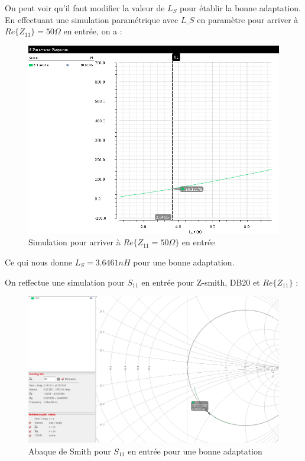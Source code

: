 \documentclass[a4paper]{article}
\begin{document}
On peut voir qu'il faut modifier la valeur de $L_S$ pour \'etablir la bonne
adaptation. En effectuant une simulation param\'etrique avec $L\_S$ en param\`etre
pour arriver \`a $Re\{Z_{11}\} = 50 \Omega$ en entr\'ee, on a :

\begin{figure}[!htb]
\begin{center}
  \includegraphics[width=0.7\linewidth]{Q2-C-sim-adaptation.png}
  \caption{Simulation pour arriver \`a $Re\{Z_{11} = 50 \Omega\}$ en entr\'ee }
  \label{RES11-param-LS}
\end{center}
\end{figure}

Ce qui nous donne $L_S = 3.6461 nH$ pour une bonne adaptation.

\clearpage

On reffectue une simulation pour $S_{11}$ en entr\'ee pour Z-smith, DB20 et $Re\{Z_{11}\}$ :

\begin{figure}[!htb]
\begin{center}
  \includegraphics[width=\linewidth]{Q2-S11-Smith-adapted.png}
  \caption{Abaque de Smith pour $S_{11}$ en entr\'ee pour une bonne adaptation }
  \label{S11-adapted}
\end{center}
\end{figure}
\end{document}

